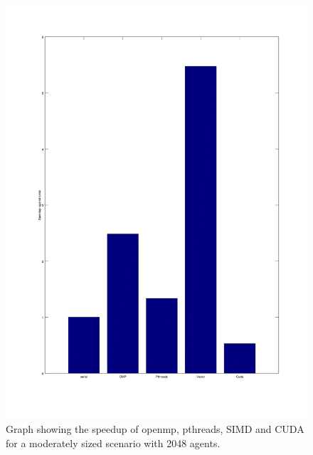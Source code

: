 \documentclass[a4paper,11pt]{article}
\begin{document}
\begin{figure}[h!]
\includegraphics[width=\textwidth]{graph1.png}
\caption{Graph showing the speedup of openmp, pthreads, SIMD and CUDA for a moderately sized scenario with 2048 agents.}
\label{graph1}
\end{figure}
\end{document}
